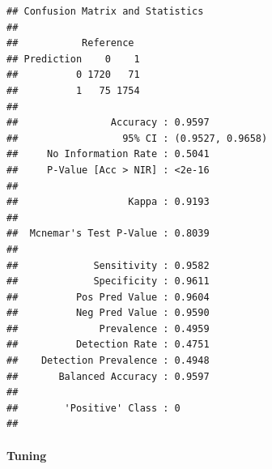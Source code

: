 \documentclass[
]{article}
\newenvironment{Shaded}{\begin{snugshade}}{\end{snugshade}}
\newcommand{\AttributeTok}[1]{\textcolor[rgb]{0.77,0.63,0.00}{#1}}
\newcommand{\DecValTok}[1]{\textcolor[rgb]{0.00,0.00,0.81}{#1}}
\newcommand{\FloatTok}[1]{\textcolor[rgb]{0.00,0.00,0.81}{#1}}
\newcommand{\FunctionTok}[1]{\textcolor[rgb]{0.00,0.00,0.00}{#1}}
\newcommand{\NormalTok}[1]{#1}
\newcommand{\OtherTok}[1]{\textcolor[rgb]{0.56,0.35,0.01}{#1}}
\newcommand{\SpecialCharTok}[1]{\textcolor[rgb]{0.00,0.00,0.00}{#1}}
\newcommand{\StringTok}[1]{\textcolor[rgb]{0.31,0.60,0.02}{#1}}
\begin{document}
\begin{verbatim}
## Confusion Matrix and Statistics
## 
##           Reference
## Prediction    0    1
##          0 1720   71
##          1   75 1754
##                                           
##                Accuracy : 0.9597          
##                  95% CI : (0.9527, 0.9658)
##     No Information Rate : 0.5041          
##     P-Value [Acc > NIR] : <2e-16          
##                                           
##                   Kappa : 0.9193          
##                                           
##  Mcnemar's Test P-Value : 0.8039          
##                                           
##             Sensitivity : 0.9582          
##             Specificity : 0.9611          
##          Pos Pred Value : 0.9604          
##          Neg Pred Value : 0.9590          
##              Prevalence : 0.4959          
##          Detection Rate : 0.4751          
##    Detection Prevalence : 0.4948          
##       Balanced Accuracy : 0.9597          
##                                           
##        'Positive' Class : 0               
## 
\end{verbatim}

\hypertarget{tuning}{%
\paragraph{Tuning}\label{tuning}}

\begin{Shaded}
\end{Shaded}
\end{document}
